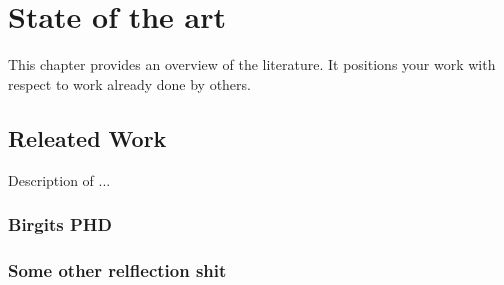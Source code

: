 \chapter{State of the art}
This chapter provides an overview of the literature. It positions your work with respect to
work already done by others.
\section{Releated Work}
Description of ...

\subsection{Birgits PHD}

\subsection{Some other relflection shit}
